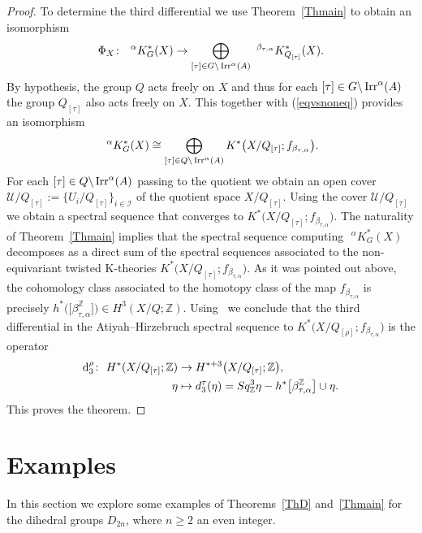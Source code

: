 \documentclass[pdftex]{sigma}
\def\Z{\mathbb{Z}}
\newcommand{\cali}{\mathcal{I}}
\newcommand{\calu}{\mathcal{U}}
\DeclareMathOperator{\Irr}{\textup{Irr}}
\theoremstyle{definition}
\numberwithin{equation}{section}
\begin{document}
\begin{proof}
To determine the third differential we use Theorem~\ref{Thmain} to obtain an isomorphism
\begin{gather*}
\Phi_{X}\colon \ \phantom{i}^{\alpha}K_{G}^{\ast}(X)\rightarrow
\bigoplus_{[\tau]\in G\backslash \Irr^{\alpha}(A)}\phantom{i}
^{\beta_{\tau,\alpha}}K^{\ast}_{Q_{[\tau]}}(X).
\end{gather*}
By hypothesis, the group $Q$ acts freely on $X$ and thus for each $[\tau]\in G\backslash \Irr^{\alpha}(A)$
the group $Q_{[\tau]}$ also acts freely on $X$. This together with (\ref{eqvsnoneq})
provides an isomorphism
\begin{gather*}
\phantom{i}^{\alpha}K_{G}^{\ast}(X)\cong
\bigoplus_{[\tau]\in Q \backslash \Irr^{\alpha}(A)} K^{*}\big(X/Q_{[\tau]}; f_{\beta_{\tau,\alpha}}\big).
\end{gather*}
For each $[\tau]\in Q \backslash \Irr^{\alpha}(A)$ passing to the quotient we obtain an open cover
$\calu/Q_{[\tau]}:=\!\big\{U_{i}/Q_{[\tau]}\big\}_{i\in \cali}$ of the quotient space $X/Q_{[\tau]}$. Using the
cover $\calu/Q_{[\tau]}$ we obtain a spectral sequence that converges to
$K^{*}\big(X/Q_{[\tau]}; f_{\beta_{\tau,\alpha}}\big)$. The naturality of Theorem~\ref{Thmain} implies that
the spectral sequence computing $\phantom{i}^{\alpha}K_{G}^{\ast}(X)$ decomposes as a direct sum
of the spectral sequences associated to the non-equivariant twisted K-theories
$K^{*}\big(X/Q_{[\tau]}; f_{\beta_{\tau,\alpha}}\big)$. As it was pointed out above,
the cohomology class associated to the homotopy class of the map $f_{\beta_{\tau,\alpha}}$ is precisely
$h^{*}\big(\big[\beta_{\tau,\alpha}^\Z\big]\big)\in H^{3}(X/Q;\Z)$. \mbox{Using}~\cite[Proposition~4.6]{Atiyah-Segal2} we conclude
that the third differential in the Atiyah--Hirzebruch spectral sequence to
$K^{*}\big(X/Q_{[\rho]}; f_{\beta_{\tau,\alpha}}\big)$ is the operator
\begin{align*}
{\rm d}^\rho_3\colon\ H^{*}(X/Q_{[\tau]};\Z) &\to H^{*+3}\big(X/Q_{[\tau]};\Z\big),
\\
\eta&\mapsto d^\tau_3(\eta)= Sq^3_\Z \eta - h^*\big[\beta_{\tau,\alpha}^\Z\big] \cup \eta.
\end{align*}
This proves the theorem.
\end{proof}

\section{Examples}\label{Section 5}

In this section we explore some examples of Theorems~\ref{ThD} and~\ref{Thmain}
for the dihedral groups $D_{2n}$, where $n\ge 2$ an even integer.
\end{document}
